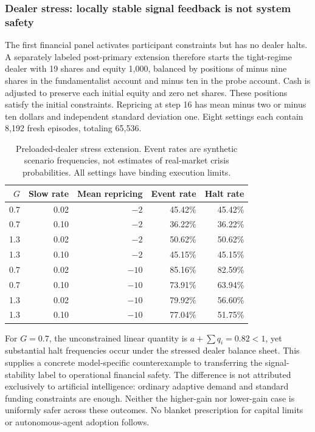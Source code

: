 \documentclass[10pt,twocolumn,letterpaper]{article}
\theoremstyle{definition}
\theoremstyle{remark}
\begin{document}
\subsubsection{Dealer stress: locally stable signal feedback is not system safety}
The first financial panel activates participant constraints but has no dealer halts. A separately labeled post-primary extension therefore starts the tight-regime dealer with 19 shares and equity 1,000, balanced by positions of minus nine shares in the fundamentalist account and minus ten in the probe account. Cash is adjusted to preserve each initial equity and zero net shares. These positions satisfy the initial constraints. Repricing at step 16 has mean minus two or minus ten dollars and independent standard deviation one. Eight settings each contain 8,192 fresh episodes, totaling 65,536.

\begin{table}[htbp]
\centering\small
\caption{Preloaded-dealer stress extension. Event rates are synthetic scenario frequencies, not estimates of real-market crisis probabilities. All settings have binding execution limits.}
\label{tab:dealer_stress}
\begin{tabular}{r r r r r}
\toprule
$G$ & Slow rate & Mean repricing & Event rate & Halt rate\\
\midrule
0.7 & 0.02 & $-2$ & 45.42\% & 45.42\%\\
0.7 & 0.10 & $-2$ & 36.22\% & 36.22\%\\
1.3 & 0.02 & $-2$ & 50.62\% & 50.62\%\\
1.3 & 0.10 & $-2$ & 45.15\% & 45.15\%\\
0.7 & 0.02 & $-10$ & 85.16\% & 82.59\%\\
0.7 & 0.10 & $-10$ & 73.91\% & 63.94\%\\
1.3 & 0.02 & $-10$ & 79.92\% & 56.60\%\\
1.3 & 0.10 & $-10$ & 77.04\% & 51.75\%\\
\bottomrule
\end{tabular}
\end{table}

For $G=0.7$, the unconstrained linear quantity is $a+\sum q_i=0.82<1$, yet substantial halt frequencies occur under the stressed dealer balance sheet. This supplies a concrete model-specific counterexample to transferring the signal-stability label to operational financial safety. The difference is not attributed exclusively to artificial intelligence: ordinary adaptive demand and standard funding constraints are enough. Neither the higher-gain nor lower-gain case is uniformly safer across these outcomes. No blanket prescription for capital limits or autonomous-agent adoption follows.
\end{document}
